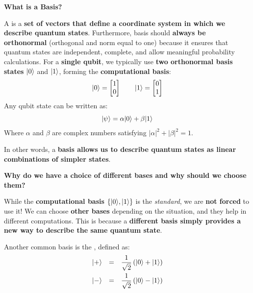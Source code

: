 \highspace
\begin{flushleft}
    \textcolor{Green3}{ \textbf{What is a Basis?}}
\end{flushleft}
A  is a \textbf{set of vectors that define a coordinate system in which we describe quantum states}. Furthermore, basis should \textbf{always be orthonormal} (orthogonal and norm equal to one) because it ensures that quantum states are independent, complete, and allow meaningful probability calculations. For a \textbf{single qubit}, we typically use \textbf{two orthonormal basis states} $| 0 \rangle$ and $| 1 \rangle$, forming the \textbf{computational basis}:
\begin{equation*}
    | 0 \rangle = \begin{bmatrix}1\\0\end{bmatrix}
    \hspace{2em}
    | 1 \rangle = \begin{bmatrix}0\\1\end{bmatrix}
\end{equation*}
Any qubit state can be written as:
\begin{equation*}
    | \psi \rangle = \alpha | 0 \rangle + \beta | 1 \rangle
\end{equation*}
Where $\alpha$ and $\beta$ are complex numbers satisfying $\left|\alpha\right|^{2} + \left|\beta\right|^{2} = 1$.

\highspace
In other words, a \textbf{basis allows us to describe quantum states as linear combinations of simpler states}.

\highspace
\begin{flushleft}
    \textcolor{Green3}{ \textbf{Why do we have a choice of different bases and why should we choose them?}}
\end{flushleft}
While the \textbf{computational basis} $\left\{| 0 \rangle, | 1 \rangle\right\}$ is the \emph{standard}, we are \textbf{not forced} to use it! We can choose \textbf{other bases} depending on the situation, and they help in different computations. This is because a \textbf{different basis simply provides a new way to describe the same quantum state}.

\highspace
Another common basis is the , defined as:
\begin{equation*}
    \begin{array}{rcl}
        | + \rangle &=& \dfrac{1}{\sqrt{2}}\left(| 0 \rangle + | 1 \rangle\right) \\ [1em]
        | - \rangle &=& \dfrac{1}{\sqrt{2}}\left(| 0 \rangle - | 1 \rangle\right)
    \end{array}
\end{equation*}

